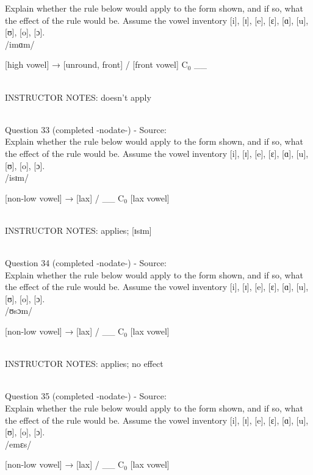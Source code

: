 \documentclass[12pt]{article}
\begin{document}
Explain whether the rule below would apply to the form shown, and if so, what the effect of the rule would be. Assume the vowel inventory [i], [ɪ], [e], [ɛ], [ɑ], [u], [ʊ], [o], [ɔ].\\

/imɑm/

{[high vowel]} →  {[unround, front]} / {[front vowel]} C$_0$ \_\_ 


~\\
INSTRUCTOR NOTES: doesn't apply


~\\

{\large Question 33} (completed -nodate-) - Source: \\

Explain whether the rule below would apply to the form shown, and if so, what the effect of the rule would be. Assume the vowel inventory [i], [ɪ], [e], [ɛ], [ɑ], [u], [ʊ], [o], [ɔ].\\

/isɪm/

{[non-low vowel]} →  {[lax]} / \_\_ C$_0$ {[lax vowel]}


~\\
INSTRUCTOR NOTES: applies; [ɪsɪm]


~\\

{\large Question 34} (completed -nodate-) - Source: \\

Explain whether the rule below would apply to the form shown, and if so, what the effect of the rule would be. Assume the vowel inventory [i], [ɪ], [e], [ɛ], [ɑ], [u], [ʊ], [o], [ɔ].\\

/ʊsɔm/

{[non-low vowel]} →  {[lax]} / \_\_ C$_0$ {[lax vowel]}


~\\
INSTRUCTOR NOTES: applies; no effect


~\\

{\large Question 35} (completed -nodate-) - Source: \\

Explain whether the rule below would apply to the form shown, and if so, what the effect of the rule would be. Assume the vowel inventory [i], [ɪ], [e], [ɛ], [ɑ], [u], [ʊ], [o], [ɔ].\\

/emɛs/

{[non-low vowel]} →  {[lax]} / \_\_ C$_0$ {[lax vowel]}
\end{document}
